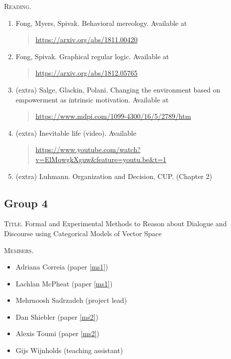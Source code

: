 \documentclass[11pt, oneside]{article}
\begin{document}
\textsc{Reading.}
\begin{enumerate}
\item \label{ds1}
  Fong, Myers, Spivak. Behavioral mereology. Available at
  \begin{quote}
    \href{https://arxiv.org/abs/1811.00420}{https://arxiv.org/abs/1811.00420}
  \end{quote}
\item \label{ds2}
  Fong, Spivak. Graphical regular logic. Available at
  \begin{quote}
    \href{https://arxiv.org/abs/1812.05765}{https://arxiv.org/abs/1812.05765}
  \end{quote}
\item (extra) Salge, Glackin, Polani. Changing the
  environment based on empowerment as intrinsic
  motivation. Available at
  \begin{quote}
    \href{https://www.mdpi.com/1099-4300/16/5/2789/htm}{https://www.mdpi.com/1099-4300/16/5/2789/htm}
  \end{quote}
\item (extra) Inevitable life (video). Available
  \begin{quote} \href{https://www.youtube.com/watch?v=ElMqwgkXguw\&feature=youtu.be\&t=1}{https://www.youtube.com/watch?v=ElMqwgkXguw\&feature=youtu.be\&t=1}
  \end{quote}
\item (extra)
  Luhmann. Organization and Decision, CUP. (Chapter 2)
\end{enumerate}

\pagebreak

%
%

\subsection*{Group 4}

\textsc{Title.}  Formal and Experimental Methods to
Reason about Dialogue and Discourse using Categorical Models
of Vector Space

\textsc{Members.}
\begin{multicols}{2}
  \begin{itemize}
  \item Adriana Correia (paper \ref{ms1})
  \item Lachlan McPheat (paper \ref{ms1})
  \item Mehrnoosh Sadrzadeh (project lead)
  \item Dan Shiebler (paper \ref{ms2})
  \item Alexis Toumi (paper \ref{ms2})
  \item Gijs Wijnholds (teaching assistant)
  \end{itemize}
\end{multicols}
\end{document}
